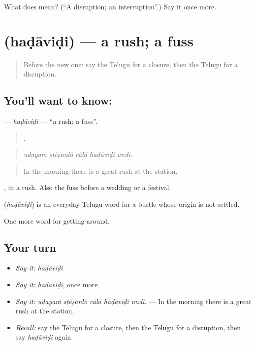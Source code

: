 \begin{tcolorbox}[breakable,colback=teal!4,colframe=teal!35!black,title={Before you move on}]
What does  mean? (\textquotedblleft{}A disruption; an interruption\textquotedblright{}.) Say it once more.
\end{tcolorbox}
\section[\texorpdfstring{\te{హడావిడి} (haḍāviḍi)}{హడావిడి (haḍāviḍi)}]{ (haḍāviḍi) — a rush; a fuss}

\label{lesson:TE-C469-hadavidi}



\begin{quote}
Before the new one: say the Telugu for a closure, then the Telugu for a disruption.
\end{quote}

\subsection*{You'll want to know: }
\textbf{} — \emph{haḍāviḍi} — \textquotedblleft{}a rush; a fuss\textquotedblright{}.

\begin{quote}
    .
\end{quote}

\begin{quote}
\emph{udayaṁ sṭēṣanlō cālā haḍāviḍi undi.}
\end{quote}

\begin{quote}
In the morning there is a great rush at the station.
\end{quote}

, in a rush. Also the fuss before a wedding or a festival.

\begin{cousinweb}
\textbf{} (\emph{haḍāviḍi}) is an everyday Telugu word for a bustle whose origin is not settled.
\end{cousinweb}

\begin{grammarlens}[title={What you've built}]
One more word for getting around.
\end{grammarlens}

\subsection*{Your turn}
\begin{itemize}
\raggedright
  \item \emph{Say it:} \emph{haḍāviḍi}
  \item \emph{Say it:} \emph{haḍāviḍi}, once more
  \item \emph{Say it:} \emph{udayaṁ sṭēṣanlō cālā haḍāviḍi undi.} — In the morning there is a great rush at the station.
  \item \emph{Recall:} say the Telugu for a closure, then the Telugu for a disruption, then say \emph{haḍāviḍi} again
\end{itemize}

